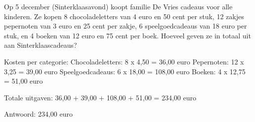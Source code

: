 \begin{opgave}
Op 5 december (Sinterklaasavond) koopt familie De Vries cadeaus voor alle 
kinderen. Ze kopen 8 chocoladeletters van 4 euro en 50 cent per stuk, 12 
zakjes pepernoten van 3 euro en 25 cent per zakje, 6 speelgoedcadeaus van 18 
euro per stuk, en 4 boeken van 12 euro en 75 cent per boek. Hoeveel geven ze 
in totaal uit aan Sinterklaascadeaus?
\end{opgave}

\begin{oplossing}
Kosten per categorie:
Chocoladeletters: 8 x 4,50 = 36,00 euro
Pepernoten: 12 x 3,25 = 39,00 euro
Speelgoedcadeaus: 6 x 18,00 = 108,00 euro
Boeken: 4 x 12,75 = 51,00 euro

Totale uitgaven:
36,00 + 39,00 + 108,00 + 51,00 = 234,00 euro

Antwoord: 234,00 euro
\end{oplossing}